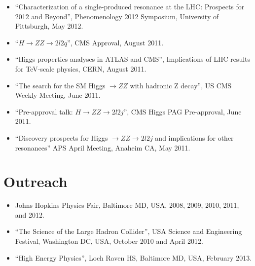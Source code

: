 \documentclass[12pt,oneside,final]{thesis}
\begin{document}
\begin{vita}
\begin{itemize}
\item ``Characterization of a single-produced resonance at the LHC: Prospects for 2012 and Beyond'', Phenomenology 2012 Symposium, University of Pittsburgh, May 2012.

\item ``$H \to ZZ \to 2l2q$'', CMS Approval, August 2011.

\item ``Higgs properties analyses in ATLAS and CMS'', Implications of LHC results for TeV-scale physics, CERN,  August 2011.

\item ``The search for the SM Higgs $\to ZZ$ with hadronic Z decay'', US CMS Weekly Meeting, June 2011.

\item ``Pre-approval talk: $H \to ZZ \to 2l 2j$'', CMS Higgs PAG Pre-approval, June 2011.

\item ``Discovery prospects for Higgs $\to ZZ \to 2l2j$ and implications for other resonances'' APS April Meeting, Anaheim CA, May 2011.

\end{itemize}

\section*{Outreach}

\begin{itemize}
\item Johns Hopkins Physics Fair, Baltimore MD, USA, 2008, 2009, 2010, 2011, and 2012.
\item ``The Science of the Large Hadron Collider'', USA Science and Engineering Festival, Washington DC, USA, October 2010 and April 2012.
\item ``High Energy Physics'', Loch Raven HS, Baltimore MD, USA, February 2013.
\end{itemize}

\end{vita}
\end{document}
